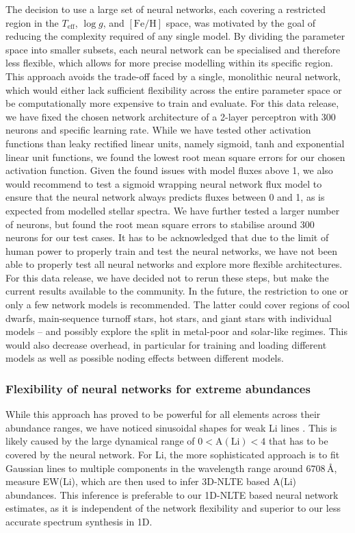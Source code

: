 \documentclass[
  journal=pasa,
  manuscript=research-paper, %
  year=2024,
  volume=37
]{cup-journal}
\newcommand{\Teff}{$T_\mathrm{eff}$\xspace}
\newcommand{\logg}{$\log g$\xspace}
\newcommand{\feh}{$\mathrm{[Fe/H]}$\xspace}
\newcommand{\TLF}{\Teff, \logg, and \feh}
\begin{document}
The decision to use a large set of neural networks, each covering a restricted region in the \TLF space, was motivated by the goal of reducing the complexity required of any single model. By dividing the parameter space into smaller subsets, each neural network can be specialised and therefore less flexible, which allows for more precise modelling within its specific region. This approach avoids the trade-off faced by a single, monolithic neural network, which would either lack sufficient flexibility across the entire parameter space or be computationally more expensive to train and evaluate. For this data release, we have fixed the chosen network architecture of a 2-layer perceptron with 300 neurons and specific learning rate. While we have tested other activation functions than leaky rectified linear units, namely sigmoid, tanh and exponential linear unit functions, we found the lowest root mean square errors for our chosen activation function. Given the found issues with model fluxes above 1, we also would recommend to test a sigmoid wrapping neural network flux model to ensure that the neural network always predicts fluxes between 0 and 1, as is expected from modelled stellar spectra. We have further tested a larger number of neurons, but found the root mean square errors to stabilise around 300 neurons for our test cases. It has to be acknowledged that due to the limit of human power to properly train and test the neural networks, we have not been able to properly test all neural networks and explore more flexible architectures. For this data release, we have decided not to rerun these steps, but make the current results available to the community. In the future, the restriction to one or only a few network models is recommended. The latter could cover regions of cool dwarfs, main-sequence turnoff stars, hot stars, and giant stars with individual models -- and possibly explore the split in metal-poor and solar-like regimes. This would also decrease overhead, in particular for training and loading different models as well as possible noding effects between different models.

\subsubsection{Flexibility of neural networks for extreme abundances}

While this approach has proved to be powerful for all elements across their abundance ranges, we have noticed sinusoidal shapes for weak Li lines \citep[see also][]{Wang2021}. This is likely caused by the large dynamical range of $0 < \mathrm{A(Li)} < 4$ that has to be covered by the neural network. For Li, the more sophisticated approach is to fit Gaussian lines to multiple components in the wavelength range around $6708\,\text{\AA}$, measure EW(Li), which are then used to infer 3D-NLTE based A(Li) abundances. This inference is preferable to our 1D-NLTE based neural network estimates, as it is independent of the network flexibility and superior to our less accurate spectrum synthesis in 1D.
\end{document}
